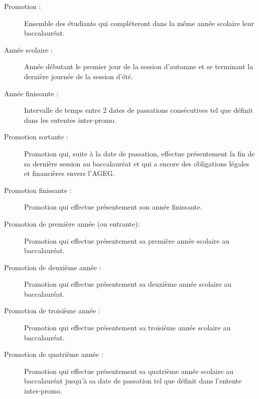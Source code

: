 \begin{description}
\item[Promotion :]{Ensemble des étudiants qui compléteront dans la même année scolaire leur baccalauréat.}
\item[Année scolaire :]{Année débutant le premier jour de la session d'automne et se terminant la dernière journée de la session d'été.}
\item[Année finissante :]{Intervalle de temps entre 2 dates de passations consécutives tel que définit dans les ententes inter-promo.}
\item[Promotion sortante :]{Promotion qui, suite à la date de passation, effectue présentement la fin de sa dernière session au baccalauréat et qui a encore des obligations légales et financières envers l’AGEG.}
\item[Promotion finissante :]{Promotion qui effectue présentement son année finissante.}
\item[Promotion  de première année (ou entrante):]{Promotion qui effectue présentement sa première année scolaire au baccalauréat.}
\item[Promotion de deuxième année :]{Promotion qui effectue présentement sa deuxième année scolaire au baccalauréat.}
\item[Promotion de troisième année :]{Promotion qui effectue présentement sa troisième année scolaire au baccalauréat.}
\item[Promotion de quatrième année :]{Promotion qui effectue présentement sa quatrième année scolaire au baccalauréat jusqu'à sa date de passation tel que définit dans l'entente inter-promo.}
\end{description}

